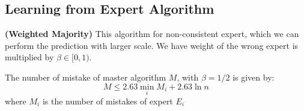 \subsection{Learning from Expert Algorithm}

\begin{definition}{\textbf{(Weighted Majority)}}
    This algorithm for non-consistent expert, which we can perform the prediction with larger scale. We have weight of the wrong expert is multiplied by $\beta \in [0, 1)$.
\end{definition}

\begin{theorem}
    The number of mistake of master algorithm $M$, with $\beta=1/2$ is given by:
    \begin{equation*}
        M \le 2.63\min_iM_i + 2.63\ln n
    \end{equation*}
    where $M_i$ is the number of mistakes of expert $E_i$ 
\end{theorem}
